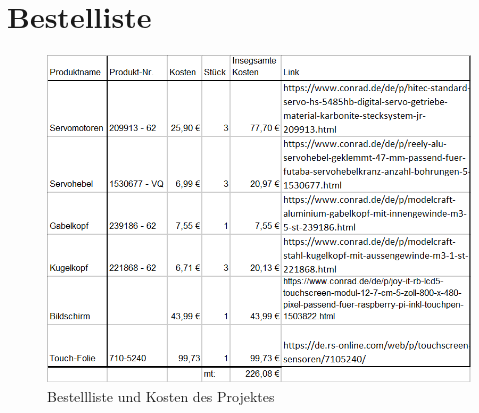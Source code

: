 \documentclass[12pt,a4paper,bibliography=totoc,listof=totoc]{scrartcl}
\begin{document}
\section {Bestelliste}

\begin{figure}[htbp]
	\centering
	\includegraphics[scale = 0.8]{pics/Bestelliste}
	\caption{Bestellliste und Kosten des Projektes}
	\label{bestell}
\end{figure}
\end{document}
